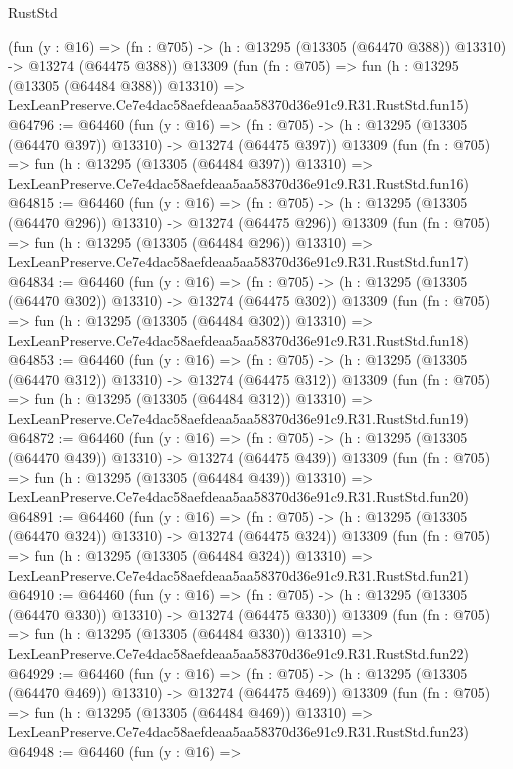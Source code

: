 \begin{lexlean}{RustStd}
\begin{coremodule}
    (fun (y : @16) =>
    (fn : @705) -> (h : @13295 (@13305 (@64470 @388)) @13310) -> @13274 (@64475 @388))
    @13309
    (fun (fn : @705) =>
    fun (h : @13295 (@13305 (@64484 @388)) @13310) =>
    LexLeanPreserve.Ce7e4dac58aefdeaa5aa58370d36e91c9.R31.RustStd.fun15)
@64796 := @64460
    (fun (y : @16) =>
    (fn : @705) -> (h : @13295 (@13305 (@64470 @397)) @13310) -> @13274 (@64475 @397))
    @13309
    (fun (fn : @705) =>
    fun (h : @13295 (@13305 (@64484 @397)) @13310) =>
    LexLeanPreserve.Ce7e4dac58aefdeaa5aa58370d36e91c9.R31.RustStd.fun16)
@64815 := @64460
    (fun (y : @16) =>
    (fn : @705) -> (h : @13295 (@13305 (@64470 @296)) @13310) -> @13274 (@64475 @296))
    @13309
    (fun (fn : @705) =>
    fun (h : @13295 (@13305 (@64484 @296)) @13310) =>
    LexLeanPreserve.Ce7e4dac58aefdeaa5aa58370d36e91c9.R31.RustStd.fun17)
@64834 := @64460
    (fun (y : @16) =>
    (fn : @705) -> (h : @13295 (@13305 (@64470 @302)) @13310) -> @13274 (@64475 @302))
    @13309
    (fun (fn : @705) =>
    fun (h : @13295 (@13305 (@64484 @302)) @13310) =>
    LexLeanPreserve.Ce7e4dac58aefdeaa5aa58370d36e91c9.R31.RustStd.fun18)
@64853 := @64460
    (fun (y : @16) =>
    (fn : @705) -> (h : @13295 (@13305 (@64470 @312)) @13310) -> @13274 (@64475 @312))
    @13309
    (fun (fn : @705) =>
    fun (h : @13295 (@13305 (@64484 @312)) @13310) =>
    LexLeanPreserve.Ce7e4dac58aefdeaa5aa58370d36e91c9.R31.RustStd.fun19)
@64872 := @64460
    (fun (y : @16) =>
    (fn : @705) -> (h : @13295 (@13305 (@64470 @439)) @13310) -> @13274 (@64475 @439))
    @13309
    (fun (fn : @705) =>
    fun (h : @13295 (@13305 (@64484 @439)) @13310) =>
    LexLeanPreserve.Ce7e4dac58aefdeaa5aa58370d36e91c9.R31.RustStd.fun20)
@64891 := @64460
    (fun (y : @16) =>
    (fn : @705) -> (h : @13295 (@13305 (@64470 @324)) @13310) -> @13274 (@64475 @324))
    @13309
    (fun (fn : @705) =>
    fun (h : @13295 (@13305 (@64484 @324)) @13310) =>
    LexLeanPreserve.Ce7e4dac58aefdeaa5aa58370d36e91c9.R31.RustStd.fun21)
@64910 := @64460
    (fun (y : @16) =>
    (fn : @705) -> (h : @13295 (@13305 (@64470 @330)) @13310) -> @13274 (@64475 @330))
    @13309
    (fun (fn : @705) =>
    fun (h : @13295 (@13305 (@64484 @330)) @13310) =>
    LexLeanPreserve.Ce7e4dac58aefdeaa5aa58370d36e91c9.R31.RustStd.fun22)
@64929 := @64460
    (fun (y : @16) =>
    (fn : @705) -> (h : @13295 (@13305 (@64470 @469)) @13310) -> @13274 (@64475 @469))
    @13309
    (fun (fn : @705) =>
    fun (h : @13295 (@13305 (@64484 @469)) @13310) =>
    LexLeanPreserve.Ce7e4dac58aefdeaa5aa58370d36e91c9.R31.RustStd.fun23)
@64948 := @64460
    (fun (y : @16) =>

\end{coremodule}
\end{lexlean}
